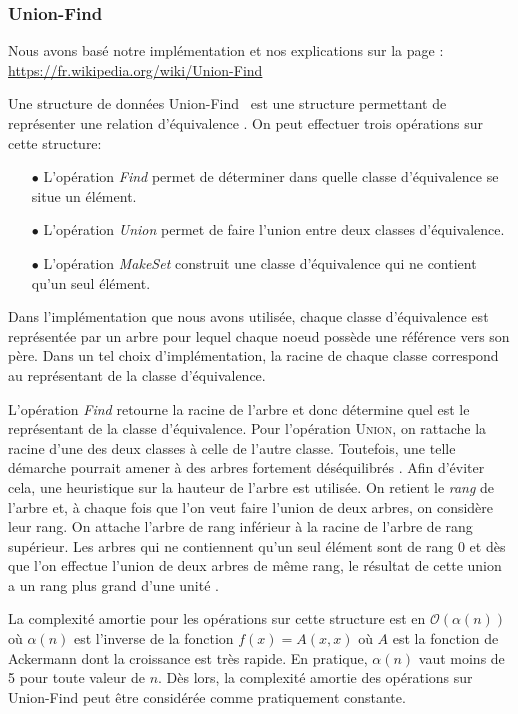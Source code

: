 \subsubsection{Union-Find}
\label{section:unionFind}

Nous avons basé notre implémentation et nos explications sur la page : \url{https://fr.wikipedia.org/wiki/Union-Find}

Une structure de données \og Union-Find \fg~est une structure permettant de représenter une relation d'équivalence . On peut effectuer trois opérations sur cette structure:
\begin{itemize}
\item[$\bullet$] L'opération \emph{Find} permet de déterminer dans quelle classe d'équivalence se situe un élément.
\item[$\bullet$] L'opération \emph{Union} permet de faire l'union entre deux classes d'équivalence.
\item[$\bullet$] L'opération \emph{MakeSet} construit une classe d'équivalence qui ne contient qu'un seul élément.
\end{itemize}

Dans l'implémentation que nous avons utilisée, chaque classe d'équivalence est représentée par un arbre pour lequel chaque noeud possède une référence vers son père. Dans un tel choix d'implémentation, la racine de chaque classe correspond au représentant de la classe d'équivalence.

L'opération \emph{Find} retourne la racine de l'arbre et donc détermine quel est le représentant de la classe d'équivalence. Pour l'opération \textsc{Union}, on rattache la racine d'une des deux classes à celle de l'autre classe. Toutefois, une telle démarche pourrait amener à des arbres fortement déséquilibrés . Afin d'éviter cela, une heuristique sur la hauteur de l'arbre est utilisée. On retient le \emph{rang} de l'arbre et, à chaque fois que l'on veut faire l'union de deux arbres, on considère leur rang. On attache l'arbre de rang inférieur à la racine de l'arbre de rang supérieur. Les arbres qui ne contiennent qu'un seul élément sont de rang 0 et dès que l'on effectue l'union de deux arbres de même rang, le résultat de cette union a un rang plus grand d'une unité .

La complexité amortie pour les opérations sur cette structure  est en $\mathcal{O}(\alpha (n))$ où $\alpha(n)$ est l'inverse de la fonction $f(x) = A(x,x)$ où $A$ est la fonction de Ackermann dont la croissance est très rapide. En pratique, $\alpha(n)$ vaut moins de 5 pour toute valeur de $n$. Dès lors, la complexité amortie des opérations sur Union-Find peut être considérée comme pratiquement constante.



